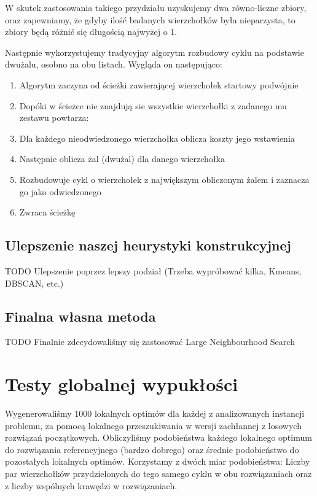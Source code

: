 \documentclass[11pt]{article}
\begin{document}
W skutek zastosowania takiego przydziału uzyskujemy dwa równo-liczne zbiory, oraz zapewniamy, że gdyby ilość badanych wierzchołków była nieparzysta, to zbiory będą różnić się długością najwyżej o 1.

Następnie wykorzystujemy tradycyjny algorytm rozbudowy cyklu na podstawie dwużalu, osobno na obu listach.
Wygląda on następująco:

\begin{enumerate}
    \item Algorytm zaczyna od ścieżki zawierającej wierzchołek startowy podwójnie
    \item Dopóki w ścieżce nie znajdują sie wszystkie wierzchołki z zadanego mu zestawu powtarza:
    \item Dla każdego nieodwiedzonego wierzchołka oblicza koszty jego wstawienia
    \item Następnie oblicza żal (dwużal) dla danego wierzchołka
    \item Rozbudowuje cykl o wierzchołek z największym obliczonym żalem i zaznacza go jako odwiedzonego
    \item Zwraca ścieżkę
\end{enumerate}

\subsection{Ulepszenie naszej heurystyki konstrukcyjnej}\label{subsec:ulepszenie-naszej-heurystyki-konstrukcyjnej}

TODO
Ulepszenie poprzez lepszy podział
(Trzeba wypróbować kilka, Kmeans, DBSCAN, etc.)

\subsection{Finalna własna metoda}\label{subsec:finalna-wasna-metoda}

TODO
Finalnie zdecydowaliśmy się zastosować Large Neighbourhood Search


\section{Testy globalnej wypukłości}\label{sec:testy-globalnej-wypukosci}

Wygenerowaliśmy 1000 lokalnych optimów dla każdej z analizowanych instancji problemu, za pomocą lokalnego przeszukiwania w wersji zachłannej z losowych rozwiązań początkowych.
Obliczyliśmy podobieństwa każdego lokalnego optimum do rozwiązania referencyjnego (bardzo dobrego) oraz średnie podobieństwo do pozostałych lokalnych optimów.
Korzystamy z dwóch miar podobieństwa: Liczby par wierzchołków przydzielonych do tego samego cyklu w obu rozwiązaniach oraz z liczby wspólnych krawędzi w rozwiązaniach.
\end{document}
